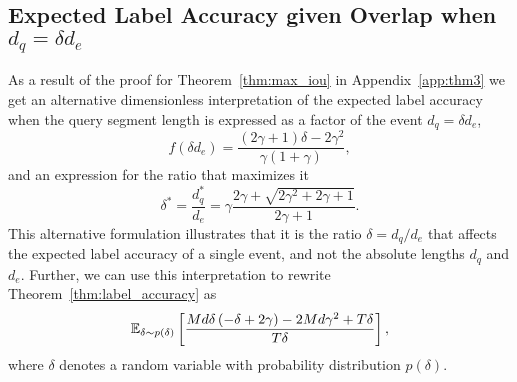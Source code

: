 \subsection{Expected Label Accuracy given Overlap when $d_q = \delta d_e$}
\label{sec:ratio_based}
As a result of the proof for Theorem~\ref{thm:max_iou} in Appendix~\ref{app:thm3} we get an alternative dimensionless interpretation of the expected label accuracy when the query segment length is expressed as a factor of the event $d_q = \delta d_e$,
\begin{equation}
    f(\delta d_e) = \frac{(2\gamma + 1)\delta - 2\gamma^2}{\gamma(1+\gamma)},
\end{equation}
and an expression for the ratio that maximizes it
\begin{equation}
    \delta^* = \frac{d_q^*}{d_e} = \gamma \frac{2\gamma + \sqrt{2\gamma^2 + 2\gamma + 1}}{2\gamma + 1}.
\end{equation}
This alternative formulation illustrates that it is the ratio $\delta = d_q/d_e$ that affects the expected label accuracy of a single event, and not the absolute lengths $d_q$ and $d_e$. Further, we can use this interpretation to rewrite Theorem~\ref{thm:label_accuracy} as
\begin{equation}
    \mathbb{E}_{\delta \sim p(\delta)} \left[\frac{M d \delta \left(- \delta + 2 \gamma\right) - 2 M d \gamma^{2} + T \delta}{T \delta}\right],
\end{equation}
where $\delta$ denotes a random variable with probability distribution $p(\delta)$. %